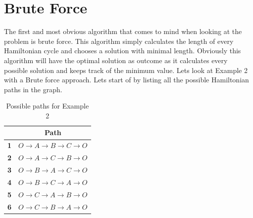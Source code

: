 \documentclass[a4paper]{article}
\begin{document}
\section*{Brute Force}
The first and most obvious algorithm  that comes to mind when looking at the problem is brute force. This algorithm simply calculates the length of every Hamiltonian cycle and chooses a solution with minimal length. Obviously this algorithm will have the optimal solution as outcome as it calculates every possible solution and keeps track of the minimum value. Lets look at Example 2 with a Brute force approach. Lets start of by listing all the possible Hamiltonian paths in the graph.
\begin{table}[H]
    \centering
    \begin{tabular}{|c|c|}
    \hline
    ~     & Path\\ 
    \hline
    \textbf{1}  & $O \to A \to B \to C \to O$         \\
    \textbf{2}  & $O \to A \to C \to B \to O$         \\
    \textbf{3}  & $O \to B \to A \to C \to O$         \\
    \textbf{4}  & $O \to B \to C \to A \to O$         \\
    \textbf{5}  & $O \to C \to A \to B \to O$         \\
    \textbf{6}  & $O \to C \to B \to A \to O$         \\
    \hline
    \end{tabular}
    \caption{Possible paths for Example 2}
    \label{tab:PathsExample1}
\end{table}
\end{document}

